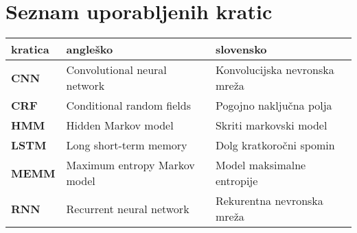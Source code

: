 \chapter*{Seznam uporabljenih kratic}

\begin{tabular}{l|l|l}
  {\bf kratica} & {\bf angleško} & {\bf slovensko} \\ \hline
  {\bf CNN} & Convolutional neural network & Konvolucijska nevronska mreža \\
  {\bf CRF} & Conditional random fields & Pogojno naključna polja \\
  {\bf HMM} & Hidden Markov model & Skriti markovski model \\
  {\bf LSTM} & Long short-term memory & Dolg kratkoročni spomin \\
  {\bf MEMM} & Maximum entropy Markov model & Model maksimalne entropije \\
  {\bf RNN} & Recurrent neural network & Rekurentna nevronska mreža \\
\end{tabular}
